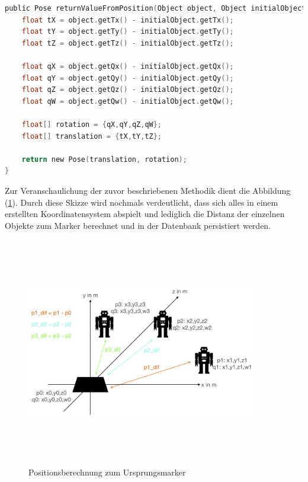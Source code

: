 \begin{lstlisting}[language=C,
    frame=lines,           % Ein Rahmen um den Code (single for box, lines for top and bottom)
    xleftmargin=\parindent,  % Rahmen link von den Zahlen
    style=algoBericht,
    label={code:differencetoinitial},
    captionpos=b,           % Caption unter den Code setzen
caption={Berechnung der Distanz zwischen Marker und Ursprungspunkt}]
public Pose returnValueFromPosition(Object object, Object initialObject){
    float tX = object.getTx() - initialObject.getTx();
    float tY = object.getTy() - initialObject.getTy();
    float tZ = object.getTz() - initialObject.getTz();

    float qX = object.getQx() - initialObject.getQx();
    float qY = object.getQy() - initialObject.getQy();
    float qZ = object.getQz() - initialObject.getQz();
    float qW = object.getQw() - initialObject.getQw();

    float[] rotation = {qX,qY,qZ,qW};
    float[] translation = {tX,tY,tZ};

    return new Pose(translation, rotation);
}
\end{lstlisting}
Zur Veranschaulichung der zuvor beschriebenen Methodik dient die Abbildung (\ref{pic:differenztoinitial}). Durch diese Skizze wird nochmals verdeutlicht, dass 
sich alles in einem erstellten Koordinatensystem abspielt und lediglich die Distanz der einzelnen Objekte zum Marker berechnet und in der Datenbank persistiert 
werden.
\begin{figure}[hbt!]
    \centering
    \includegraphics[width=10cm,height=10cm,keepaspectratio]{4Umsetzung/Bilder/difcalc.jpeg}
    \caption{Positionsberechnung zum Ursprungsmarker}
    \label{pic:differenztoinitial}
\end{figure}
